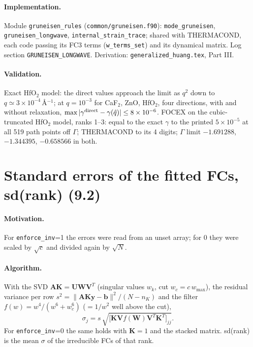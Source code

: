 \documentclass[11pt,a4paper]{article}
\newcommand{\bA}{\mathbf A}
\newcommand{\bK}{\mathbf K}
\newcommand{\bW}{\mathbf W}
\newcommand{\by}{\mathbf y}
\newcommand{\bb}{\mathbf b}
\newcommand{\code}[1]{\texttt{#1}}
\begin{document}
\paragraph{Implementation.} Module \code{gruneisen\_rules} (\code{common/gruneisen.f90}): \code{mode\_gruneisen},
\code{gruneisen\_longwave}, \code{internal\_strain\_trace}; shared with THERMACOND, each code passing its
FC3 terms (\code{w\_terms\_set}) and its dynamical matrix. Log section \code{GRUNEISEN\_LONGWAVE}.
Derivation: \code{generalized\_huang.tex}, Part III.

\paragraph{Validation.} Exact HfO$_2$ model: the direct values approach the limit as $q^2$ down to
$q\simeq3\times10^{-4}$\,\AA$^{-1}$; at $q=10^{-3}$ for CaF$_2$, ZnO, HfO$_2$, four directions, with and
without relaxation, $\max|\gamma^{\rm direct}-\gamma(\hat q)|\le8\times10^{-6}$. FOCEX on the cubic-truncated
HfO$_2$ model, ranks 1--3: equal to the exact $\gamma$ to the printed $5\times10^{-5}$ at all 519 path points
off $\Gamma$; THERMACOND to its 4 digits; $\Gamma$ limit $-1.691288$, $-1.344395$, $-0.658566$ in both.

\section{Standard errors of the fitted FCs, sd(rank) (9.2)}\label{sec:sd}
\paragraph{Motivation.} For \code{enforce\_inv}=1 the errors were read from an unset array; for 0 they were
scaled by $\sqrt{c}$ and divided again by $\sqrt N$.

\paragraph{Algorithm.} With the SVD $\bA\bK=\mathbf U\bW\mathbf V^T$ (singular values $w_k$, cut
$w_c=c\,w_{\max}$), the residual variance per row $s^2=\|\bA\bK\by-\bb\|^2/(N-n_K)$ and the filter
$f(w)=w^4/(w^6+w_c^6)$ ($=1/w^2$ well above the cut),
\begin{equation}
\sigma_j=s\,\sqrt{\big[\bK\mathbf Vf(\bW)\mathbf V^T\bK^T\big]_{jj}} .
\end{equation}
For \code{enforce\_inv}=0 the same holds with $\bK=1$ and the stacked matrix. sd(rank) is the mean $\sigma$ of the irreducible FCs of that rank.
\end{document}
